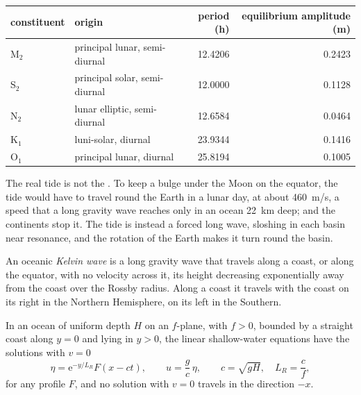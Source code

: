 \begin{center}
\small
\begin{tabular}{llrr}
\hline
constituent & origin & period (\unit{h}) & equilibrium amplitude (\unit{m}) \\
\hline
M$_2$ & principal lunar, semi-diurnal & \num{12.4206} & \num{0.2423} \\
S$_2$ & principal solar, semi-diurnal & \num{12.0000} & \num{0.1128} \\
N$_2$ & lunar elliptic, semi-diurnal & \num{12.6584} & \num{0.0464} \\
K$_1$ & luni-solar, diurnal & \num{23.9344} & \num{0.1416} \\
O$_1$ & principal lunar, diurnal & \num{25.8194} & \num{0.1005} \\
\hline
\end{tabular}
\end{center}

The real tide is not the . To keep a bulge under the Moon
on the equator, the tide would have to travel round the Earth in a lunar
day, at about \qty{460}{m/s}, a speed that a long gravity wave reaches only
in an ocean \qty{22}{km} deep; and the continents stop it. The tide is
instead a forced long wave, sloshing in each basin near resonance, and the
rotation of the Earth makes it turn round the basin.

\begin{definition}\label{def:b3:ocean-dynamics:kelvin-wave}
An oceanic \emph{Kelvin wave} is a long gravity wave
that travels along a coast, or along the equator, with no velocity across
it, its height decreasing exponentially away from the coast over the
Rossby radius. Along a coast it travels with the coast on its right in the
Northern Hemisphere, on its left in the Southern.
\end{definition}

\begin{theorem}\label{thm:b3:ocean-dynamics:kelvin}
In an ocean of uniform depth $H$ on an $f$-plane, with $f > 0$, bounded by a
straight coast along $y = 0$ and lying in $y > 0$, the linear shallow-water
equations have the solutions with $v = 0$
\[
\eta = \mathrm e^{-y/L_R}F(x - ct),\qquad u = \frac{g}{c}\,\eta,\qquad
c = \sqrt{gH},\quad L_R = \frac{c}{f},
\]
for any profile $F$, and no solution with $v = 0$ travels in the direction
$-x$.
\end{theorem}


